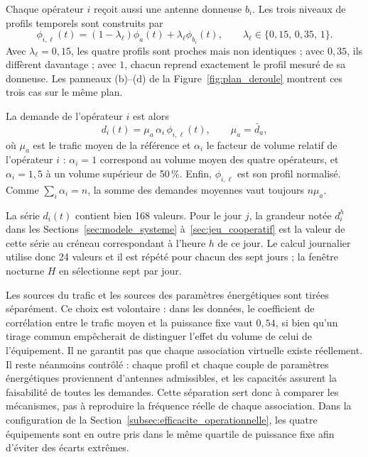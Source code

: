 Chaque opérateur \(i\) reçoit aussi une antenne donneuse \(b_i\). Les trois
niveaux de profils temporels sont construits par
\begin{equation}
    \phi_{i,\ell}(t)
    =(1-\lambda_\ell)\phi_a(t)+\lambda_\ell \phi_{b_i}(t),
    \qquad
    \lambda_\ell\in\{0{,}15,\,0{,}35,\,1\}.
    \label{eq:forme_synthetique}
\end{equation}
Avec \(\lambda_\ell=0{,}15\), les quatre profils sont proches mais non
identiques ; avec \(0{,}35\), ils diffèrent davantage ; avec \(1\), chacun
reprend exactement le profil mesuré de sa donneuse. Les panneaux
(b)--(d) de la Figure~\ref{fig:plan_deroule} montrent ces trois cas sur le
même plan.

La demande de l'opérateur \(i\) est alors
\begin{equation}
    d_i(t)=\mu_a\,\alpha_i\,\phi_{i,\ell}(t),
    \qquad
    \mu_a=\bar d_a,
    \label{eq:demande_synthetique}
\end{equation}
où \(\mu_a\) est le trafic moyen de la référence et \(\alpha_i\) le facteur
de volume relatif de l'opérateur \(i\) : \(\alpha_i=1\) correspond au volume
moyen des quatre opérateurs, et \(\alpha_i=1{,}5\) à un volume supérieur de
50\,\%. Enfin, \(\phi_{i,\ell}\) est son profil normalisé. Comme
\(\sum_i\alpha_i=n\), la somme des demandes moyennes vaut toujours
\(n\mu_a\).

La série \(d_i(t)\) contient bien 168 valeurs. Pour le jour \(j\), la grandeur
notée \(d_i^h\) dans les Sections~\ref{sec:modele_systeme}
à~\ref{sec:jeu_cooperatif} est la valeur de cette série au
créneau correspondant à l'heure \(h\) de ce jour. Le calcul journalier utilise
donc 24 valeurs et il est répété pour chacun des sept jours ; la fenêtre
nocturne \(H\) en sélectionne sept par jour.

Les sources du trafic et les sources des paramètres énergétiques sont
tirées séparément. Ce choix est volontaire : dans les données, le coefficient
de corrélation entre le trafic moyen et la puissance fixe vaut \(0{,}54\), si bien qu'un tirage
commun empêcherait de distinguer l'effet du volume de celui de l'équipement.
Il ne garantit pas que chaque association virtuelle existe réellement. Il
reste néanmoins contrôlé : chaque profil et chaque couple de paramètres
énergétiques proviennent d'antennes admissibles, et les capacités assurent la
faisabilité de toutes les demandes. Cette séparation sert donc à comparer les
mécanismes, pas à reproduire la fréquence réelle de chaque association. Dans
la configuration de la Section~\ref{subsec:efficacite_operationnelle}, les
quatre équipements sont en outre pris dans le même quartile de puissance fixe
afin d'éviter des écarts extrêmes.

